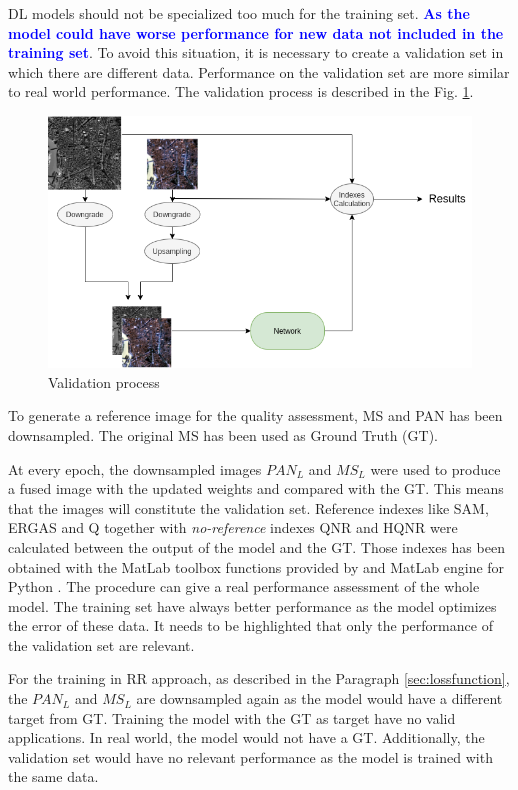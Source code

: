 \documentclass[12pt]{report}
\newcommand{\bb}[1]{\textcolor{blue}{\textbf{#1}}}
\begin{document}
DL models should not be specialized too much for the training set.
\bb{As the model could have worse performance for new data not included in the training set}.
To avoid this situation, it is necessary to create a validation set in which there are different data. 
Performance on the validation set are more similar to real world performance.
The validation process is described in the Fig. \ref{fig:validation}.

\begin{figure}[t]
    \centering
    \includegraphics[scale=.5]{validation.png}
    \caption{Validation process}
    \label{fig:validation}
\end{figure}

To generate a reference image for the quality assessment, MS and PAN has been downsampled.
The original MS has been used as Ground Truth (GT).

At every epoch, the downsampled images $PAN_L$ and $MS_L$ were used 
to produce a fused image with the updated weights and compared with the GT.
This means that the images will constitute the validation set. 
Reference indexes like SAM, ERGAS and Q together with \textit{no-reference} indexes QNR and HQNR were calculated between the output of the model and the GT.
Those indexes has been obtained with the MatLab toolbox functions provided by \cite{criticalComparison} and MatLab engine 
for Python \cite{matlab}.
The procedure can give a real performance assessment of the whole model.
The training set have always better performance as the model optimizes the 
error of these data. It needs to be highlighted that only the performance of the validation set are relevant. 

For the training in RR approach, as described in the Paragraph \ref{sec:lossfunction}, the $PAN_L$ and $MS_L$ are downsampled again as the model
would have a different target from GT.
Training the model with the GT as target have no valid applications.
In real world, the model would not have a GT.
Additionally, the validation set would have no relevant performance as the model is trained with the same data.
\end{document}
